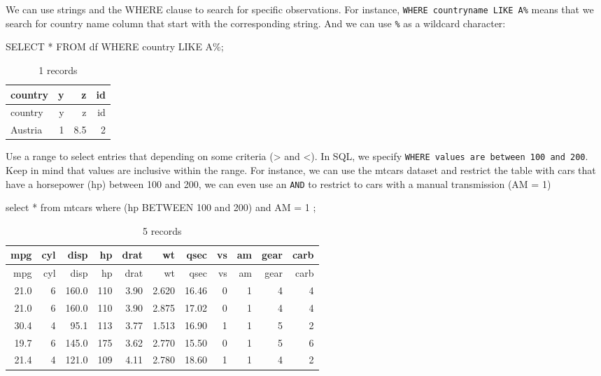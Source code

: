 \documentclass[
  letterpaper,
  DIV=11,
  numbers=noendperiod]{scrreprt}
\newenvironment{Shaded}{\begin{snugshade}}{\end{snugshade}}
\newcommand{\DecValTok}[1]{\textcolor[rgb]{0.68,0.00,0.00}{#1}}
\newcommand{\KeywordTok}[1]{\textcolor[rgb]{0.00,0.23,0.31}{#1}}
\newcommand{\NormalTok}[1]{\textcolor[rgb]{0.00,0.23,0.31}{#1}}
\newcommand{\OperatorTok}[1]{\textcolor[rgb]{0.37,0.37,0.37}{#1}}
\newcommand{\StringTok}[1]{\textcolor[rgb]{0.13,0.47,0.30}{#1}}
\begin{document}
We can use strings and the WHERE clause to search for specific
observations. For instance,
\texttt{WHERE\ countryname\ LIKE\ \textquotesingle{}A\%\textquotesingle{}}
means that we search for country name column that start with the
corresponding string. And we can use \texttt{\%} as a wildcard
character:

\begin{Shaded}
\begin{Highlighting}[]
\KeywordTok{SELECT} \OperatorTok{*} \KeywordTok{FROM}\NormalTok{ df }\KeywordTok{WHERE}\NormalTok{ country }\KeywordTok{LIKE} \StringTok{\textquotesingle{}A\%\textquotesingle{}}\NormalTok{;}
\end{Highlighting}
\end{Shaded}

\begin{longtable}[]{@{}lrrr@{}}
\caption{1 records}\tabularnewline
\toprule()
country & y & z & id \\
\midrule()
\endfirsthead
\toprule()
country & y & z & id \\
\midrule()
\endhead
Austria & 1 & 8.5 & 2 \\
\bottomrule()
\end{longtable}

Use a range to select entries that depending on some criteria
(\textgreater{} and \textless). In SQL, we specify
\texttt{WHERE\ values\ are\ between\ 100\ and\ 200}. Keep in mind that
values are inclusive within the range. For instance, we can use the
mtcars dataset and restrict the table with cars that have a horsepower
(hp) between 100 and 200, we can even use an \texttt{AND} to restrict to
cars with a manual transmission (AM = 1)

\begin{Shaded}
\begin{Highlighting}[]
\KeywordTok{select} \OperatorTok{*} \KeywordTok{from}\NormalTok{ mtcars}
\KeywordTok{where}\NormalTok{ (hp }\KeywordTok{BETWEEN} \DecValTok{100} \KeywordTok{and} \DecValTok{200}\NormalTok{) }\KeywordTok{and}\NormalTok{ AM }\OperatorTok{=} \DecValTok{1}\NormalTok{ ;}
\end{Highlighting}
\end{Shaded}

\begin{longtable}[]{@{}rrrrrrrrrrr@{}}
\caption{5 records}\tabularnewline
\toprule()
mpg & cyl & disp & hp & drat & wt & qsec & vs & am & gear & carb \\
\midrule()
\endfirsthead
\toprule()
mpg & cyl & disp & hp & drat & wt & qsec & vs & am & gear & carb \\
\midrule()
\endhead
21.0 & 6 & 160.0 & 110 & 3.90 & 2.620 & 16.46 & 0 & 1 & 4 & 4 \\
21.0 & 6 & 160.0 & 110 & 3.90 & 2.875 & 17.02 & 0 & 1 & 4 & 4 \\
30.4 & 4 & 95.1 & 113 & 3.77 & 1.513 & 16.90 & 1 & 1 & 5 & 2 \\
19.7 & 6 & 145.0 & 175 & 3.62 & 2.770 & 15.50 & 0 & 1 & 5 & 6 \\
21.4 & 4 & 121.0 & 109 & 4.11 & 2.780 & 18.60 & 1 & 1 & 4 & 2 \\
\bottomrule()
\end{longtable}
\end{document}
